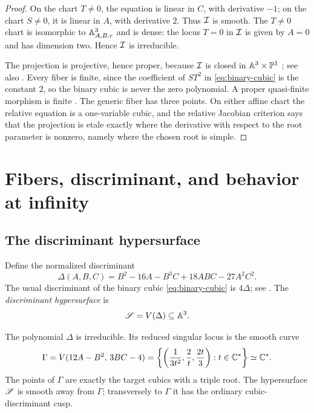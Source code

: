 \begin{proof}
On the chart $T\neq0$, the equation is linear in $C$, with derivative $-1$; on the chart $S\neq0$, it is linear in $A$, with derivative $2$.  Thus $\mathcal I$ is smooth.  The $T\neq0$ chart is isomorphic to $\mathbb A^3_{A,B,r}$ and is dense: the locus $T=0$ in $\mathcal I$ is given by $A=0$ and has dimension two.  Hence $\mathcal I$ is irreducible.

The projection is projective, hence proper, because $\mathcal I$ is closed in $\mathbb A^3\times\mathbb P^1$ \cite[Chapter II, Section 4]{Hartshorne1977}; see also \cite[Tag 01W7]{StacksProject}.  Every fiber is finite, since the coefficient of $ST^2$ in \eqref{eq:binary-cubic} is the constant $2$, so the binary cubic is never the zero polynomial.  A proper quasi-finite morphism is finite \cite[Tag 0F2P]{StacksProject}.  The generic fiber has three points.  On either affine chart the relative equation is a one-variable cubic, and the relative Jacobian criterion \cite[Tag 01V4, Lemma 29.35.14]{StacksProject} says that the projection is etale exactly where the derivative with respect to the root parameter is nonzero, namely where the chosen root is simple.
\end{proof}

\section{Fibers, discriminant, and behavior at infinity}\label{sec:fibers}

\subsection{The discriminant hypersurface}

\begin{definition}\label{def:discriminant-hypersurface}
Define the normalized discriminant
\begin{equation}\label{eq:Delta}
  \Delta(A,B,C)
  =B^2-16A-B^3C+18ABC-27A^2C^2.
\end{equation}
The usual discriminant of the binary cubic \eqref{eq:binary-cubic} is $4\Delta$; see \cite[Chapter 1]{GKZ1994}.  The \emph{discriminant hypersurface} is
\[
  \mathscr S=V(\Delta)\subseteq\mathbb A^3.
\]
\end{definition}

\begin{proposition}\label{prop:discriminant-geometry}
The polynomial $\Delta$ is irreducible.  Its reduced singular locus is the smooth curve
\begin{equation}\label{eq:Gamma}
  \Gamma
  =V(12A-B^2,\,3BC-4)
  =\left\{\left(\frac1{3t^2},\frac2t,\frac{2t}{3}\right):t\in\mathbb C^*\right\}
  \simeq\mathbb C^*.
\end{equation}
The points of $\Gamma$ are exactly the target cubics with a triple root.  The hypersurface $\mathscr S$ is smooth away from $\Gamma$; transversely to $\Gamma$ it has the ordinary cubic-discriminant cusp.
\end{proposition}

